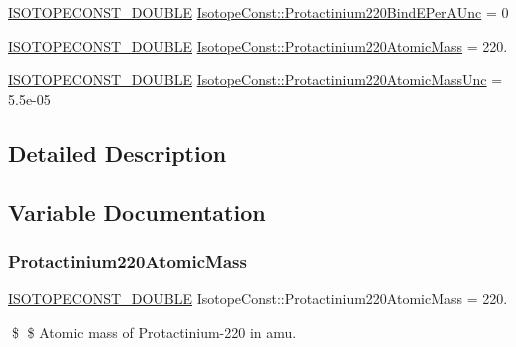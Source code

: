 \begin{DoxyCompactItemize}
\item 
\mbox{\hyperlink{group___isotope_const-_macros_ga8f45a7272ce02c0b4c65c44636ed719a}{I\+S\+O\+T\+O\+P\+E\+C\+O\+N\+S\+T\+\_\+\+D\+O\+U\+B\+LE}} \mbox{\hyperlink{group___isotope_const-_protactinium-_pa220_gac1d0fbac9d4df672a5ef49ac1853b514}{Isotope\+Const\+::\+Protactinium220\+Bind\+E\+Per\+A\+Unc}} = 0
\item 
\mbox{\hyperlink{group___isotope_const-_macros_ga8f45a7272ce02c0b4c65c44636ed719a}{I\+S\+O\+T\+O\+P\+E\+C\+O\+N\+S\+T\+\_\+\+D\+O\+U\+B\+LE}} \mbox{\hyperlink{group___isotope_const-_protactinium-_pa220_ga5d5da75a9f45e11b7add4b62138396a2}{Isotope\+Const\+::\+Protactinium220\+Atomic\+Mass}} = 220.
\item 
\mbox{\hyperlink{group___isotope_const-_macros_ga8f45a7272ce02c0b4c65c44636ed719a}{I\+S\+O\+T\+O\+P\+E\+C\+O\+N\+S\+T\+\_\+\+D\+O\+U\+B\+LE}} \mbox{\hyperlink{group___isotope_const-_protactinium-_pa220_gae3790197695f6e9fc610e3bcb437de8b}{Isotope\+Const\+::\+Protactinium220\+Atomic\+Mass\+Unc}} = 5.\+5e-\/05
\end{DoxyCompactItemize}


\subsection{Detailed Description}


\subsection{Variable Documentation}
\mbox{\label{group___isotope_const-_protactinium-_pa220_ga5d5da75a9f45e11b7add4b62138396a2}} 
\subsubsection{\texorpdfstring{Protactinium220\+Atomic\+Mass}{Protactinium220AtomicMass}}
{\footnotesize\ttfamily \mbox{\hyperlink{group___isotope_const-_macros_ga8f45a7272ce02c0b4c65c44636ed719a}{I\+S\+O\+T\+O\+P\+E\+C\+O\+N\+S\+T\+\_\+\+D\+O\+U\+B\+LE}} Isotope\+Const\+::\+Protactinium220\+Atomic\+Mass = 220.}

\$ \$ Atomic mass of Protactinium-\/220 in amu. \mbox{\label{group___isotope_const-_protactinium-_pa220_gae3790197695f6e9fc610e3bcb437de8b}} 
